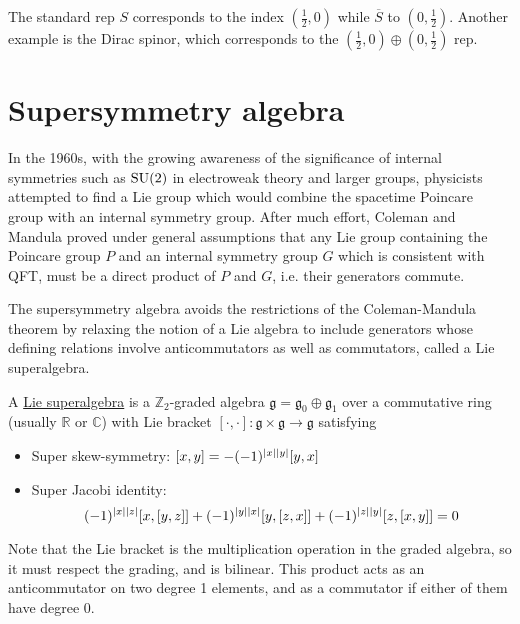 The standard rep  $S$ corresponds to the index $(\frac{1}{2},0)$ while 
$\overline{S}$ to $(0,\frac{1}{2})$. Another example is the Dirac spinor, which
corresponds to the $(\frac{1}{2},0)\oplus (0,\frac{1}{2})$ rep. 


\section{Supersymmetry algebra}
In the 1960s, with the growing awareness of the significance of internal
symmetries such as $\operatorname{SU}(2)$ in electroweak theory and larger groups,
physicists attempted to find a Lie group which would combine the spacetime
Poincare group with an internal symmetry group. After much effort, Coleman and
Mandula proved under general assumptions that any Lie group containing the
Poincare group $P$ and an internal symmetry group $G$ which is consistent with
QFT, must be a direct product of $P$ and  $G$, i.e. their generators commute.

The supersymmetry algebra avoids the restrictions of the Coleman-Mandula theorem
by relaxing the notion of a Lie algebra to include generators whose
defining relations involve anticommutators as well as commutators, called
a Lie superalgebra. 

\begin{defn}
	A \underline{Lie superalgebra} is a 
	$\mathbb{Z}_2$-graded algebra $\mathfrak{g} = \mathfrak{g}_0 \oplus \mathfrak{g}_1$ 
	over a commutative ring (usually $\mathbb{R}$ or $\mathbb{C}$)  with 
	Lie bracket $[\cdot,\cdot]:\mathfrak{g}\times \mathfrak{g} \to \mathfrak{g}$ satisfying 
	\begin{itemize}
		\item Super skew-symmetry: $[x,y] = -(-1)^{\abs{x}\abs{y}}[y,x]$
		\item Super Jacobi identity: 
		\[
			(-1)^{\abs{x}\abs{z}}[x,[y,z]]+(-1)^{\abs{y}\abs{x}}[y,[z,x]]
			+(-1)^{\abs{z}\abs{y}}[z,[x,y]]=0
		\]
	\end{itemize}
\end{defn}
Note that the Lie bracket is the multiplication operation in the graded algebra,
so it must respect the grading, and is bilinear. This product acts as an
anticommutator on two degree 1 elements, and as a commutator if either of them
have degree 0. 

